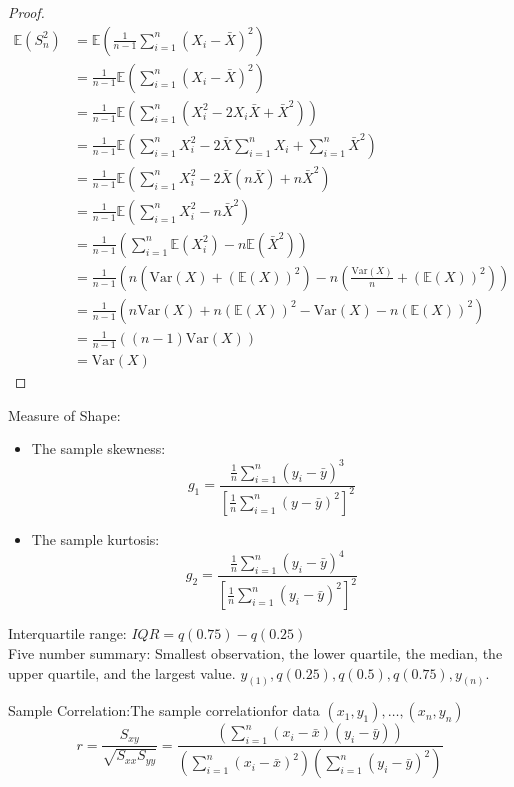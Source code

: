 \documentclass{article}
\newcommand{\E}{\mathbb{E}}
\newcommand{\Var}{\mathrm{Var}}
\newcommand{\sqr}[1]{{#1}^2}
\begin{document}
\begin{proof}
    \begin{align*}
        \E(S_n^2) &= \E\left(\frac{1}{n-1}\sum_{i=1}^{n}\sqr{(X_i - \bar{X})}\right) \\
        &= \frac{1}{n-1}\E\left(\sum_{i=1}^{n}\sqr{(X_i - \bar{X})}\right) \\
        &= \frac{1}{n-1}\E\left(\sum_{i=1}^{n} (X_i^2 - 2X_i\bar{X} + \bar{X}^2)\right) \\
        &= \frac{1}{n-1}\E\left(\sum_{i=1}^{n} X_i^2 - 2\bar{X}\sum_{i=1}^{n} X_i + \sum_{i=1}^{n} \bar{X}^2\right) \\
        &= \frac{1}{n-1}\E\left(\sum_{i=1}^{n} X_i^2 - 2\bar{X}(n\bar{X}) + n\bar{X}^2\right) \\
        &= \frac{1}{n-1}\E\left(\sum_{i=1}^{n} X_i^2 - n\bar{X}^2\right) \\
        &= \frac{1}{n-1}\left( \sum_{i=1}^{n} \E(X_i^2) - n\E(\bar{X}^2) \right)\\
        &= \frac{1}{n-1}\left( n(\Var(X) + (\E(X))^2) - n\left(\frac{\Var(X)}{n} + (\E(X))^2\right) \right) \\
        &= \frac{1}{n-1}\left( n\Var(X) + n(\E(X))^2 - \Var(X) - n(\E(X))^2 \right) \\
        &= \frac{1}{n-1}\left( (n-1)\Var(X) \right) \\
        &= \Var(X)
    \end{align*}
\end{proof}


\noindent Measure of Shape:
\begin{itemize}
    \item The sample skewness: 
        $$ g_1 = \frac{\frac{1}{n} \sum_{i=1}^{n}\left(y_i - \bar{y}\right)^3}{\sqr{\left[\frac{1}{n} \sum_{i=1}^{n}\sqr{\left(y - \bar{y}\right)}\right]}}$$
    \item The sample kurtosis:
        $$ g_2 = \frac{\frac{1}{n} \sum_{i=1}^{n}\left(y_i - \bar{y}\right)^4}{\sqr{\left[\frac{1}{n}\sum_{i=1}^{n}\sqr{\left(y_i - \bar{y}\right)}\right]}}$$
\end{itemize}

\noindent Interquartile range: $IQR = q(0.75) - q(0.25)$\\
\noindent Five number summary: Smallest observation, the lower quartile, the median, the upper quartile, and the largest value. $y_{(1)}, q(0.25), q(0.5), q(0.75), y_{(n)}$.

Sample Correlation:The sample correlationfor data ${(x_1, y_1), \dotsc,(x_n, y_n)}$
$$r = \frac{S_{xy}}{\sqrt{S_{xx}S_{yy}}} = \frac{\left(\sum_{i=1}^{n}\left(x_i - \bar{x}\right)\left(y_i - \bar{y}\right)\right)}{\left(\sum_{i=1}^{n} \sqr{\left({x_i - \bar{x}}\right)}\right) \left(\sum_{i=1}^{n}\sqr{\left({y_i - \bar{y}}\right)} \right)}$$
\end{document}
